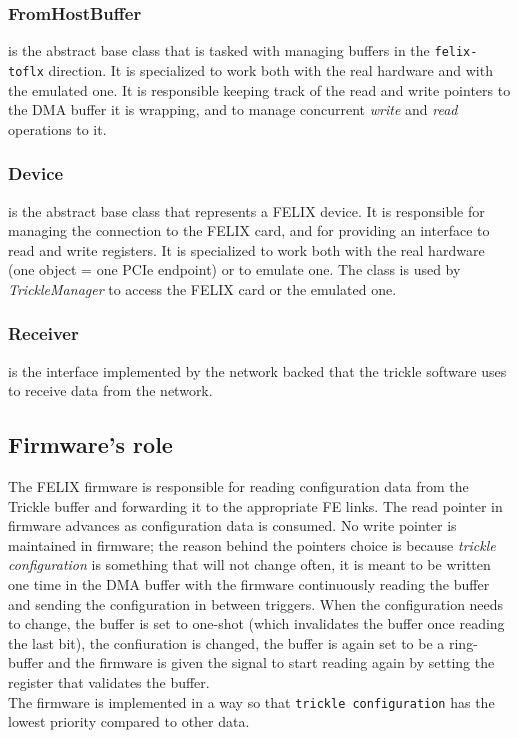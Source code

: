 \subsubsection{FromHostBuffer} is the abstract base class that is tasked with managing buffers in the \texttt{felix-toflx} direction. It is specialized to work both with the real hardware and with the emulated one. It is responsible keeping track of the read and write pointers to the \acs{DMA} buffer it is wrapping, and to manage concurrent \emph{write} and \emph{read} operations to it.

\subsubsection{Device} is the abstract base class that represents a \acs{FELIX} device. It is responsible for managing the connection to the \acs{FELIX} card, and for providing an interface to read and write registers. It is specialized to work both with the real hardware (one object = one \acs{PCIe} endpoint) or to emulate one. The class is used by \emph{TrickleManager} to access the \acs{FELIX} card or the emulated one.\\

\subsubsection{Receiver} \label{subsubsec:receiver} is the interface implemented by the network backed that the trickle software uses to receive data from the network.

\subsection{Firmware's role}

The \acs{FELIX} firmware is responsible for reading configuration data from the Trickle buffer and forwarding it to the appropriate \acs{FE} links. The read pointer in firmware advances as configuration data is consumed. No write pointer is maintained in firmware; the reason behind the pointers choice is because \textit{trickle configuration} is something that will not change often, it is meant to be written one time in the \acs{DMA} buffer with the firmware continuously reading the buffer and sending the configuration in between triggers. When the configuration needs to change, the buffer is set to one-shot (which invalidates the buffer once reading the last bit), the confiuration is changed, the buffer is again set to be a ring-buffer and the firmware is given the signal to start reading again by setting the register that validates the buffer.\\
The firmware is implemented in a way so that \texttt{trickle configuration} has the lowest priority compared to other data.

